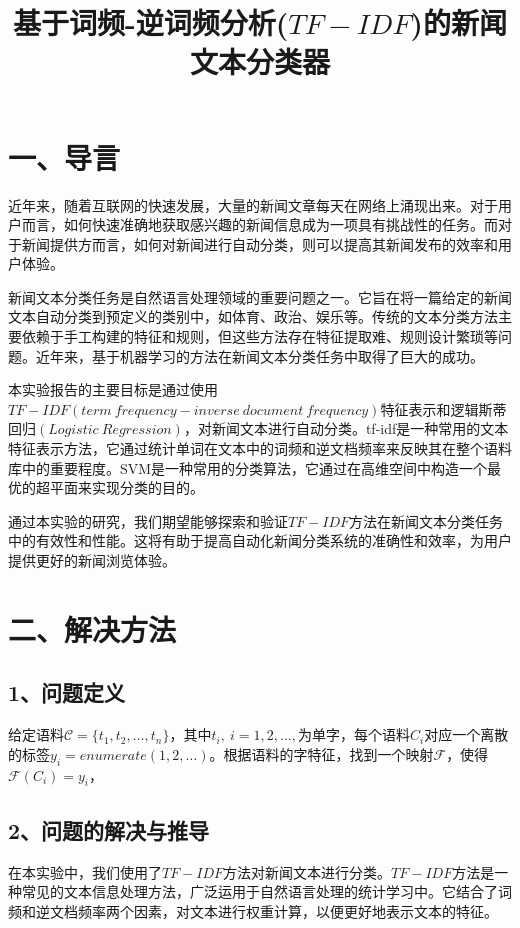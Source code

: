 \documentclass{article}
\begin{document}
\title{\Huge \centering \textbf{基于词频-逆词频分析($TF-IDF$)的新闻文本分类器}}
\date{}
\maketitle
\setlength{\parskip}{0.5\baselineskip}
\section*{\LARGE 一、导言}
近年来，随着互联网的快速发展，大量的新闻文章每天在网络上涌现出来。对于用户而言，如何快速准确地获取感兴趣的新闻信息成为一项具有挑战性的任务。而对于新闻提供方而言，如何对新闻进行自动分类，则可以提高其新闻发布的效率和用户体验。

新闻文本分类任务是自然语言处理领域的重要问题之一。它旨在将一篇给定的新闻文本自动分类到预定义的类别中，如体育、政治、娱乐等。传统的文本分类方法主要依赖于手工构建的特征和规则，但这些方法存在特征提取难、规则设计繁琐等问题。近年来，基于机器学习的方法在新闻文本分类任务中取得了巨大的成功。

本实验报告的主要目标是通过使用$TF-IDF(term\ frequency-inverse\ document\ frequency)$特征表示和逻辑斯蒂回归$(Logistic\ Regression)$，对新闻文本进行自动分类。tf-idf是一种常用的文本特征表示方法，它通过统计单词在文本中的词频和逆文档频率来反映其在整个语料库中的重要程度。SVM是一种常用的分类算法，它通过在高维空间中构造一个最优的超平面来实现分类的目的。

通过本实验的研究，我们期望能够探索和验证$TF-IDF$方法在新闻文本分类任务中的有效性和性能。这将有助于提高自动化新闻分类系统的准确性和效率，为用户提供更好的新闻浏览体验。

\section*{\LARGE 二、解决方法}
\subsection*{\Large 1、问题定义}
给定语料$\mathcal{C}=\{t_1,t_2,\dots,t_n\}$，其中$t_i,\ i=1,2,\dots,$为单字，每个语料$C_i$对应一个离散的标签$y_i=enumerate(1,2,\dots)$。根据语料的字特征，找到一个映射$\mathcal{F}$，使得$\mathcal{F}(C_i)=y_i$，


\subsection*{\Large 2、问题的解决与推导}

在本实验中，我们使用了$TF-IDF$方法对新闻文本进行分类。$TF-IDF$方法是一种常见的文本信息处理方法，广泛运用于自然语言处理的统计学习中。它结合了词频和逆文档频率两个因素，对文本进行权重计算，以便更好地表示文本的特征。
\end{document}
